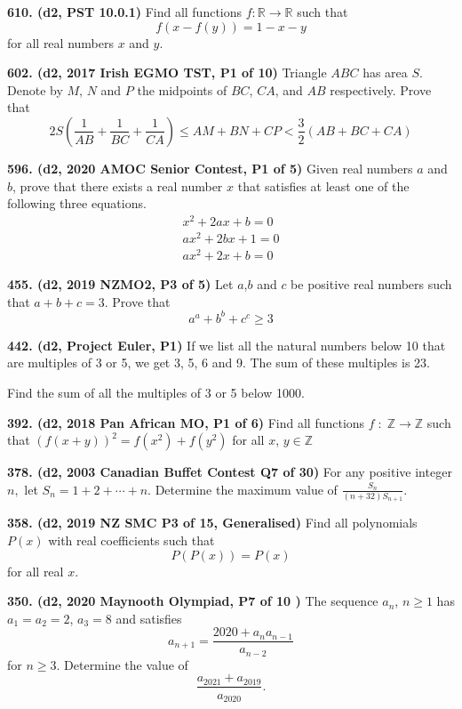 \documentclass{article}
\begin{document}
\textbf{610. (\color{red}d2\color{black}, PST 10.0.1)} Find all functions \(f : \mathbb R \to \mathbb R\) such that \[f(x - f(y)) = 1 - x - y\] for all real numbers \(x\) and \(y\).

\textbf{602. (\color{red}d2\color{black}, 2017 Irish EGMO TST, P1 of 10)} Triangle $ABC$ has area $S$. Denote by $M$, $N$ and $P$ the midpoints of $BC$, $CA$, and $AB$ respectively. Prove that
$$
    2 S(\frac{1}{A B}+\frac{1}{B C}+\frac{1}{C A}) \leq A M+B N+C P<\frac{3}{2}(A B+B C+C A)
$$

\textbf{596. (\color{red}d2\color{black}, 2020 AMOC Senior Contest, P1 of 5)} Given real numbers $a$ and $b$, prove that there exists a real number $x$ that satisfies at least one of the following three equations.
\begin{align*}
    x^{2}+2 a x+b=0   \\
    a x^{2}+2 b x+1=0 \\
    a x^{2}+2 x+b=0
\end{align*}

\textbf{455. (\color{red}d2\color{black}, 2019 NZMO2, P3 of 5)} Let $a$,$b$ and $c$ be positive real numbers such that $a+b+c= 3$.  Prove that $$a^a+b^b+c^c \geq 3$$

\textbf{442. (\color{red}d2\color{black}, Project Euler, P1)} If we list all the natural numbers below 10 that are multiples of 3 or 5, we get 3, 5, 6 and 9. The sum of these multiples is 23.

Find the sum of all the multiples of 3 or 5 below 1000.


\textbf{392. (\color{red}d2\color{black}, 2018 Pan African MO, P1 of 6)} Find all functions $f\;:\; \mathbb{Z} \longrightarrow \mathbb{Z}$ such that $(f(x + y))^2 = f(x^2) + f(y^2)$ for all $x$, $y \in \mathbb{Z}$

\textbf{378. (\color{red}d2\color{black}, 2003 Canadian Buffet Contest Q7 of 30)} For any positive integer \(n,\) let \(S_{n}=1+2+\cdots+n .\) Determine the maximum value of \(\frac{S_{n}}{(n+32) S_{n+1}}\).

\textbf{358. (\color{red}d2\color{black}, 2019 NZ SMC P3 of 15, Generalised)} Find all polynomials $P(x)$ with real coefficients such that $$P(P(x)) = P(x)$$ for all real $x$.

\textbf{350. (\color{red}d2\color{black}, 2020 Maynooth Olympiad, P7 of 10 )} The sequence $a_n$, $n \geq 1$ has $a_1 = a_2 = 2$, $a_3 = 8$ and satisfies
$$
    a_{n + 1} = \frac{2020 + a_n a_{n - 1}}{a_{n-2}}
$$
for $n \geq 3$. Determine the value of
$$
    \frac{a_{2021} + a_{2019}}{a_{2020}}.
$$
\end{document}
